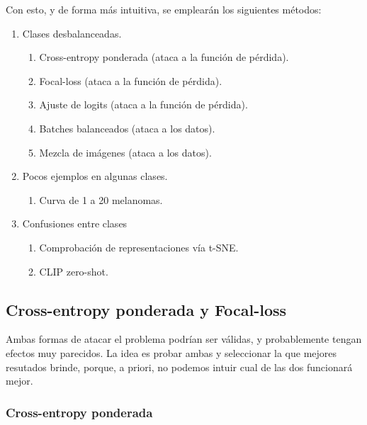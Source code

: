 \documentclass[10pt,a4paper]{article}
\renewcommand{\_}{\guionbajo\allowbreak}
\begin{document}
\begin{enumerate}
\begin{enumerate}
    \end{enumerate}

\end{enumerate}

\noindent Con esto, y de forma más intuitiva, se emplearán los siguientes métodos:

\begin{enumerate}
    \item Clases desbalanceadas. 
    \begin{enumerate}
        \item Cross-entropy ponderada (ataca a la función de pérdida). 
        \item Focal-loss (ataca a la función de pérdida). 
        \item Ajuste de logits (ataca a la función de pérdida). 
        \item Batches balanceados (ataca a los datos). 
        \item Mezcla de imágenes (ataca a los datos). 
    \end{enumerate}
    \item Pocos ejemplos en algunas clases. 
    \begin{enumerate}
        \item Curva de 1 a 20 melanomas. 
    \end{enumerate}
    \item Confusiones entre clases
    \begin{enumerate}
        \item Comprobación de representaciones vía t-SNE. 
        \item CLIP zero-shot. 
    \end{enumerate}
\end{enumerate}

\subsection{Cross-entropy ponderada y Focal-loss}
\label{subsec:cross}

\noindent Ambas formas de atacar el problema podrían ser válidas, y probablemente tengan efectos muy parecidos. 
La idea es probar ambas y seleccionar la que mejores resutados brinde, porque, a priori, no podemos intuir cual de las 
dos funcionará mejor. 

\subsubsection{Cross-entropy ponderada}
\end{document}
